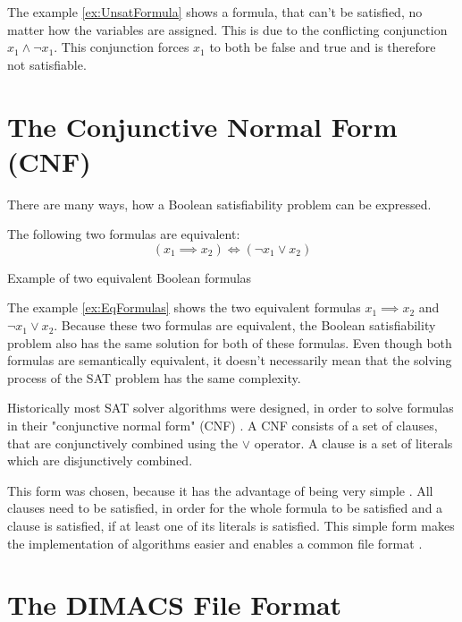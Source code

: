 The example \ref{ex:UnsatFormula} shows a formula, that can't be satisfied, no matter how the variables are assigned. This is due to the conflicting conjunction $x_1 \wedge \neg x_1$. This conjunction forces $x_1$ to both be false and true and is therefore not satisfiable.

\section{The Conjunctive Normal Form (CNF)}

There are many ways, how a Boolean satisfiability problem can be expressed.

\begin{example}
\begin{leftbar}
The following two formulas are equivalent:
\begin{displaymath}
(x_1 \implies x_2) \iff (\neg x_1 \vee x_2)
\end{displaymath}
\end{leftbar}
\caption{Example of two equivalent Boolean formulas}
\label{ex:EqFormulas}
\end{example}

The example \ref{ex:EqFormulas} shows the two equivalent formulas $x_1 \implies x_2$ and $\neg x_1 \vee x_2$. Because these two formulas are equivalent, the Boolean satisfiability problem also has the same solution for both of these formulas. Even though both formulas are semantically equivalent, it doesn't necessarily mean that the solving process of the SAT problem has the same complexity.

Historically most SAT solver algorithms were designed, in order to solve formulas in their "conjunctive normal form" (CNF) \cite{biere2009handbook}. A CNF consists of a set of clauses, that are conjunctively combined using the $\vee$ operator. A clause is a set of literals which are disjunctively combined. \cite{biere2009handbook}

This form was chosen, because it has the advantage of being very simple \cite{biere2009handbook}. All clauses need to be satisfied, in order for the whole formula to be satisfied and a clause is satisfied, if at least one of its literals is satisfied. This simple form makes the implementation of algorithms easier and enables a common file format \cite{biere2009handbook}.

\section{The DIMACS File Format}

